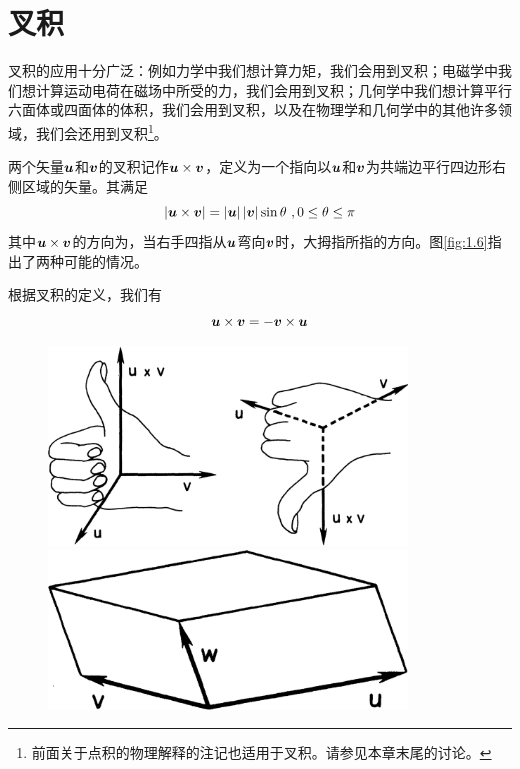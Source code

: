 \section{叉积}

叉积的应用十分广泛：例如力学中我们想计算力矩，我们会用到叉积；电磁学中我们想计算运动电荷在磁场中所受的力，我们会用到叉积；几何学中我们想计算平行六面体或四面体的体积，我们会用到叉积，以及在物理学和几何学中的其他许多领域，我们会还用到叉积\footnote{前面关于点积的物理解释的注记也适用于叉积。请参见本章末尾的讨论。}。

两个矢量$\boldsymbol{u}$和$\boldsymbol{v}$的叉积记作$\boldsymbol{u}\times \boldsymbol{v}$，定义为一个指向以$\boldsymbol{u}$和$\boldsymbol{v}$为共端边平行四边形右侧区域的矢量。其满足
\begin{equation}
    \left| \boldsymbol{u}\times \boldsymbol{v} \right|=\left| \boldsymbol{u} \right|\left| \boldsymbol{v} \right|\sin \theta \,\, ,  0\le \theta \le \pi 
\end{equation}
其中$\boldsymbol{u}\times \boldsymbol{v}$的方向为，当右手四指从$\boldsymbol{u}$弯向$\boldsymbol{v}$时，大拇指所指的方向。图\eqref{fig:1.6}指出了两种可能的情况。

根据叉积的定义，我们有
\begin{equation}
    \boldsymbol{u}\times \boldsymbol{v}=-\boldsymbol{v}\times \boldsymbol{u}
\end{equation}

\begin{figure}[htbp]
    \centering
    \begin{minipage}[b]{0.48\textwidth}
        \centering
        \includegraphics[width=0.85\textwidth]{./image/1.6.png}
        \caption{}
        \label{fig:1.6}
    \end{minipage}
    \begin{minipage}[b]{0.48\textwidth}
        \centering
        \includegraphics[width=0.85\textwidth]{./image/1.7.png}
        \caption{}
        \label{fig:1.7}
    \end{minipage}
\end{figure}

